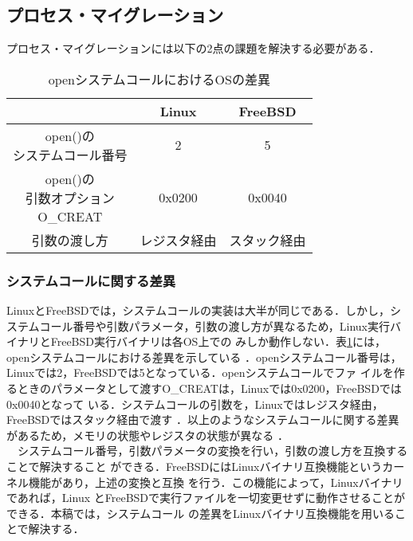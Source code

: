 \documentclass{ipsjpapers}
\begin{document}
\subsection{プロセス・マイグレーション}
プロセス・マイグレーションには以下の2点の課題を解決する必要がある．
\begin{table}[t]

  \label{tb:syscall}
  \caption{openシステムコールにおけるOSの差異}
  \vspace{0.5em}
  \begin{center}
    \begin{tabular}{|c|c|c|} \hline
       & Linux & FreeBSD  \\ \hline \hline
      \shortstack{open()の\\システムコール番号} & 2 & 5 \\ \hline
      \shortstack{open()の\\引数オプション\\O\_CREAT} & 0x0200 & 0x0040 \\ \hline
      引数の渡し方 & レジスタ経由 & スタック経由  \\ \hline
    \end{tabular}
  \end{center}
\end{table}

\subsubsection{システムコールに関する差異}
LinuxとFreeBSDでは，システムコールの実装は大半が同じである．しかし，システムコール番号や引数パラメータ，引数の渡し方が異なるため，Linux実行バイナリとFreeBSD実行バイナリは各OS上での
みしか動作しない．表\ref{tb:syscall}には，openシステムコールにおける差異を示している
．openシステムコール番号は，Linuxでは2，FreeBSDでは5となっている．openシステムコールでファ
イルを作るときのパラメータとして渡すO\_CREATは，Linuxでは0x0200，FreeBSDでは0x0040となって
いる．システムコールの引数を，Linuxではレジスタ経由，FreeBSDではスタック経由で渡す
．以上のようなシステムコールに関する差異があるため，メモリの状態やレジスタの状態が異なる
．\\
　システムコール番号，引数パラメータの変換を行い，引数の渡し方を互換することで解決すること
ができる．FreeBSDにはLinuxバイナリ互換機能\cite{linux-emu}というカーネル機能があり，上述の変換と互換
を行う．この機能によって，Linuxバイナリであれば，Linux
とFreeBSDで実行ファイルを一切変更せずに動作させることができる．本稿では，システムコール
の差異をLinuxバイナリ互換機能を用いることで解決する．
\end{document}
